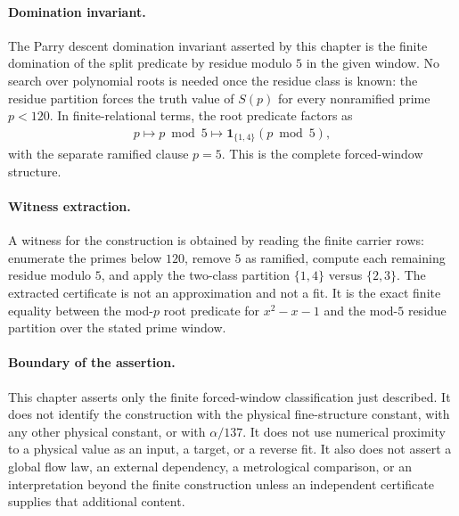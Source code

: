 \paragraph{Domination invariant.}
The Parry descent domination invariant asserted by this chapter is the finite domination of the split predicate by residue modulo $5$ in the given window.  No search over polynomial roots is needed once the residue class is known: the residue partition forces the truth value of $S(p)$ for every nonramified prime $p<120$.  In finite-relational terms, the root predicate factors as
$$
\begin{aligned}
p \longmapsto p \bmod 5 \longmapsto \mathbf{1}_{\{1,4\}}(p \bmod 5),
\end{aligned}
$$
with the separate ramified clause $p=5$.  This is the complete forced-window structure.

\paragraph{Witness extraction.}
A witness for the construction is obtained by reading the finite carrier rows: enumerate the primes below $120$, remove $5$ as ramified, compute each remaining residue modulo $5$, and apply the two-class partition $\{1,4\}$ versus $\{2,3\}$.  The extracted certificate is not an approximation and not a fit.  It is the exact finite equality between the mod-$p$ root predicate for $x^2-x-1$ and the mod-$5$ residue partition over the stated prime window.

\paragraph{Boundary of the assertion.}
This chapter asserts only the finite forced-window classification just described.  It does not identify the construction with the physical fine-structure constant, with any other physical constant, or with $\alpha/137$.  It does not use numerical proximity to a physical value as an input, a target, or a reverse fit.  It also does not assert a global flow law, an external dependency, a metrological comparison, or an interpretation beyond the finite construction unless an independent certificate supplies that additional content.
